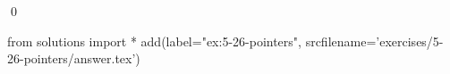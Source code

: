 
\begin{ex}
  \label{ex:5-26-pointers}
  
  \qed
\end{ex}
\begin{python0}
from solutions import *
add(label="ex:5-26-pointers",
    srcfilename='exercises/5-26-pointers/answer.tex')
\end{python0}
